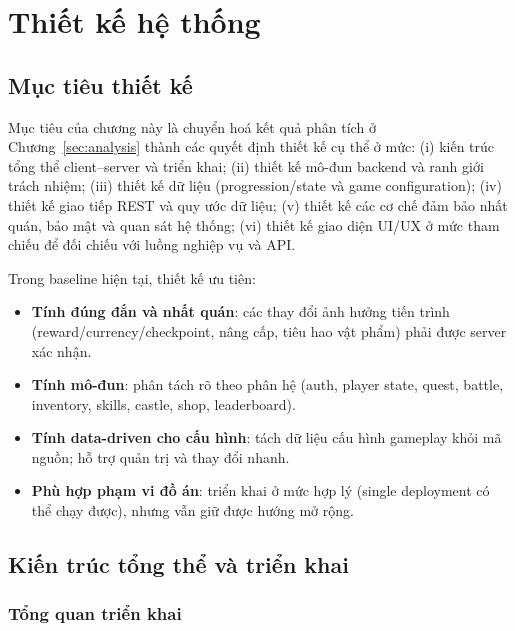 ﻿\section{Thiết kế hệ thống}
\label{sec:design}

\subsection{Mục tiêu thiết kế}
\label{subsec:design-goals}

Mục tiêu của chương này là chuyển hoá kết quả phân tích ở Chương~\ref{sec:analysis} thành các quyết định thiết kế cụ thể ở mức:
(i) kiến trúc tổng thể client--server và triển khai;
(ii) thiết kế mô-đun backend và ranh giới trách nhiệm;
(iii) thiết kế dữ liệu (progression/\allowbreak state và game configuration);
(iv) thiết kế giao tiếp REST và quy ước dữ liệu;
(v) thiết kế các cơ chế đảm bảo nhất quán, bảo mật và quan sát hệ thống;
(vi) thiết kế giao diện UI/\allowbreak UX ở mức tham chiếu để đối chiếu với luồng nghiệp vụ và API.

Trong baseline hiện tại, thiết kế ưu tiên:
\begin{itemize}
    \item \textbf{Tính đúng đắn và nhất quán}: các thay đổi ảnh hưởng tiến trình (reward/\allowbreak currency/\allowbreak checkpoint, nâng cấp, tiêu hao vật phẩm) phải được server xác nhận.
    \item \textbf{Tính mô-đun}: phân tách rõ theo phân hệ (auth, player state, quest, battle, inventory, skills, castle, shop, leaderboard).
    \item \textbf{Tính data-driven cho cấu hình}: tách dữ liệu cấu hình gameplay khỏi mã nguồn; hỗ trợ quản trị và thay đổi nhanh.
    \item \textbf{Phù hợp phạm vi đồ án}: triển khai ở mức hợp lý (single deployment có thể chạy được), nhưng vẫn giữ được hướng mở rộng.
\end{itemize}

\subsection{Kiến trúc tổng thể và triển khai}
\label{subsec:design-architecture}

\subsubsection{Tổng quan triển khai}
\label{subsubsec:design-deploy-overview}

